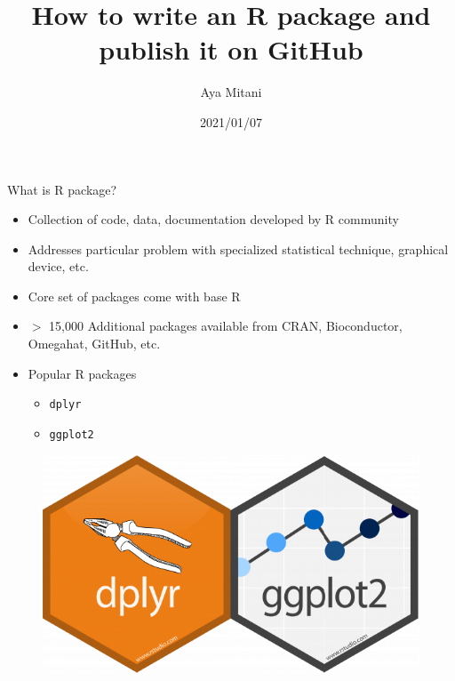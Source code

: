 \documentclass[
  ignorenonframetext,
]{beamer}
\title{How to write an R package and publish it on GitHub}
\author{Aya Mitani}
\date{2021/01/07}
\providecommand{\tightlist}{%
  \setlength{\itemsep}{0pt}\setlength{\parskip}{0pt}}
\begin{document}
\frame{\titlepage}

\begin{frame}[fragile]{What is R package?}
\protect\hypertarget{what-is-r-package}{}

\begin{itemize}
\tightlist
\item
  Collection of code, data, documentation developed by R community
\item
  Addresses particular problem with specialized statistical technique,
  graphical device, etc.
\item
  Core set of packages come with base R
\item
  \(>\) 15,000 Additional packages available from CRAN, Bioconductor,
  Omegahat, GitHub, etc.
\item
  Popular R packages

  \begin{itemize}
  \tightlist
  \item
    \texttt{dplyr}
  \item
    \texttt{ggplot2}
  \end{itemize}
\end{itemize}

\begin{figure}
  \includegraphics[scale=0.2]{slides_files/figure-beamer/dplyrggplot2.png}
\end{figure}

\end{frame}
\end{document}

